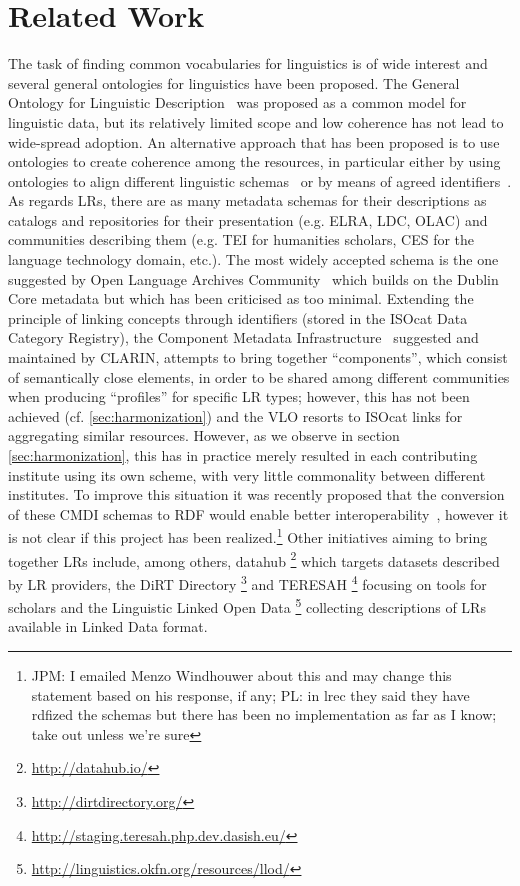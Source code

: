 \documentclass{llncs}
\begin{document}
\section{Related Work}
\label{sec:relatedwork}
The task of finding common vocabularies for linguistics is of wide interest and several general ontologies for linguistics have been proposed. The General Ontology for Linguistic Description~\cite[GOLD]{farrar2002common} was proposed as a common model for linguistic data, but its relatively limited scope and low coherence has not lead to wide-spread adoption. An alternative approach that has been proposed is to use ontologies to create coherence among the resources, in particular either by using ontologies to align different linguistic schemas~\cite{chiarcos2012ontologies} or by means of agreed identifiers~\cite{kemps2008isocat}. 
As regards LRs, there are as many metadata schemas for their descriptions as catalogs and repositories for their presentation (e.g. ELRA, LDC, OLAC) and communities describing them (e.g. TEI for humanities scholars, CES for the language technology domain, etc.). The most widely accepted schema is the one  suggested by Open Language Archives Community~\cite[OLAC]{bird2001olac} which builds on the Dublin Core metadata but which has been criticised as too minimal. 
Extending the principle of linking concepts through identifiers (stored in the ISOcat Data Category Registry), the Component Metadata Infrastructure~\cite{broeder2012cmdi} suggested and maintained by CLARIN, attempts to bring together ``components'', which consist of semantically close elements, in order to be shared among different communities when producing ``profiles'' for specific LR types; however, this has not been achieved (cf. \ref{sec:harmonization}) and the VLO resorts to ISOcat links for aggregating similar resources. 
However, as  we observe in section \ref{sec:harmonization}, this has in practice merely resulted in each contributing institute using its own scheme, with very little commonality between different institutes. To improve this situation it was recently proposed that the conversion of these CMDI schemas to RDF would enable better interoperability~\cite{durco2014clarin}, however it is not clear if this project has been realized.\footnote{JPM: I emailed Menzo Windhouwer about this and may change this statement based on his response, if any; PL: in lrec they said they have rdfized the schemas but there has been no implementation as far as I know; take out unless we're sure}
Other initiatives aiming to bring together LRs include, among others, datahub \footnote{\url{http://datahub.io/}} which targets datasets described by LR providers, the DiRT Directory \footnote{\url{http://dirtdirectory.org/}} and TERESAH \footnote{\url{http://staging.teresah.php.dev.dasish.eu/}} focusing on tools for scholars and the Linguistic Linked Open Data \footnote{\url{http://linguistics.okfn.org/resources/llod/}} collecting descriptions of LRs available in Linked Data format.
\end{document}
